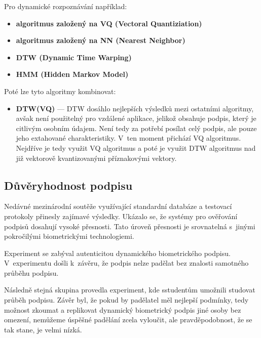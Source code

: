 \noindent
Pro dynamické rozpoznávání například:
\begin{itemize}
  \item \textbf{algoritmus založený na VQ (Vectoral Quantiziation)}
  \item \textbf{algoritmus založený na NN (Nearest Neighbor)}
  \item \textbf{DTW (Dynamic Time Warping)}
  \item \textbf{HMM (Hidden Markov Model)}
\end{itemize}
Poté lze tyto algoritmy kombinovat:
\begin{itemize}
  \item \textbf{DTW(VQ)} --- DTW dosáhlo nejlepších výsledků mezi ostatními algoritmy, avšak není použitelný pro vzdálené aplikace, jelikož obsahuje podpis, který je citlivým osobním údajem.
  Není tedy za potřebí posílat celý podpis, ale pouze jeho extahované charakteristiky.
  V~ten moment přichází VQ algoritmus. Nejdříve je tedy využit VQ algoritmus a poté je využit DTW algoritmus nad již vektorově kvantizovanými příznakovými vektory.~\cite{Jain2006}
\end{itemize}

\subsection*{Důvěryhodnost podpisu}
Nedávné mezinárodní soutěže využívající standardní databáze a testovací protokoly přinesly zajímavé výsledky. %
Ukázalo se, že systémy pro ověřování podpisů dosahují vysoké přesnosti.                                       %
Tato úroveň přesnosti je srovnatelná s~jinými pokročilými biometrickými technologiemi.~\cite{Impedovo2008}    %

Experiment se zabýval autenticitou dynamického biometrického podpisu.
V~experimentu došli k~závěru, že podpis nelze padělat bez znalosti samotného průběhu podpisu.~\cite{6986974} %

Následně stejná skupina provedla experiment, kde sstudentům umožnili studovat průběh podpisu.
Závěr byl, že pokud by padělatel měl nejlepší podmínky, tedy možnost zkoumat a replikovat dynamický biometrický podpis jiné osoby bez omezení, 
nemůžeme úspěšné padělání zcela vyloučit, ale pravděpodobnost, že se tak stane, je velmi nízká.~\cite{8585636} %

